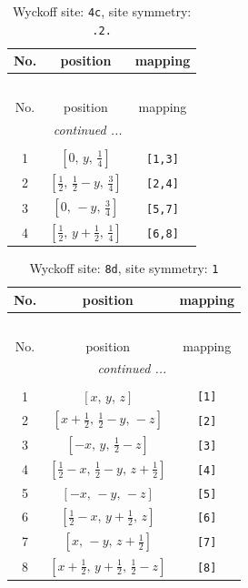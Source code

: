 \documentclass[fleqn,8pt]{jsarticle}
\begin{document}
\renewcommand{\arraystretch}{1.2}
\begin{longtable}{ccc}
\caption{Wyckoff site: {\tt 4c}, site symmetry: {\tt .2.}}
 \\
 \hline \hline
No. & position & mapping \\ \hline \endfirsthead

\multicolumn{2}{l}{\tablename\ \thetable{}} \\
 \hline \hline
No. & position & mapping \\ \hline \endhead

 \hline \hline
\multicolumn{2}{r}{\footnotesize\it continued ...} \\ \endfoot

 \hline \hline
\multicolumn{2}{r}{} \\ \endlastfoot

1 & $\left[ 0,\, y,\, \frac{1}{4} \right]$ & {\tt [1,3]} \\ \hline
2 & $\left[ \frac{1}{2},\, \frac{1}{2} - y,\, \frac{3}{4} \right]$ & {\tt [2,4]} \\ \hline
3 & $\left[ 0,\, - y,\, \frac{3}{4} \right]$ & {\tt [5,7]} \\ \hline
4 & $\left[ \frac{1}{2},\, y + \frac{1}{2},\, \frac{1}{4} \right]$ & {\tt [6,8]} \\
\end{longtable}
\renewcommand{\arraystretch}{1.2}
\begin{longtable}{ccc}
\caption{Wyckoff site: {\tt 8d}, site symmetry: {\tt 1}}
 \\
 \hline \hline
No. & position & mapping \\ \hline \endfirsthead

\multicolumn{2}{l}{\tablename\ \thetable{}} \\
 \hline \hline
No. & position & mapping \\ \hline \endhead

 \hline \hline
\multicolumn{2}{r}{\footnotesize\it continued ...} \\ \endfoot

 \hline \hline
\multicolumn{2}{r}{} \\ \endlastfoot

1 & $\left[ x,\, y,\, z \right]$ & {\tt [1]} \\ \hline
2 & $\left[ x + \frac{1}{2},\, \frac{1}{2} - y,\, - z \right]$ & {\tt [2]} \\ \hline
3 & $\left[ - x,\, y,\, \frac{1}{2} - z \right]$ & {\tt [3]} \\ \hline
4 & $\left[ \frac{1}{2} - x,\, \frac{1}{2} - y,\, z + \frac{1}{2} \right]$ & {\tt [4]} \\ \hline
5 & $\left[ - x,\, - y,\, - z \right]$ & {\tt [5]} \\ \hline
6 & $\left[ \frac{1}{2} - x,\, y + \frac{1}{2},\, z \right]$ & {\tt [6]} \\ \hline
7 & $\left[ x,\, - y,\, z + \frac{1}{2} \right]$ & {\tt [7]} \\ \hline
8 & $\left[ x + \frac{1}{2},\, y + \frac{1}{2},\, \frac{1}{2} - z \right]$ & {\tt [8]} \\
\end{longtable}
\end{document}
